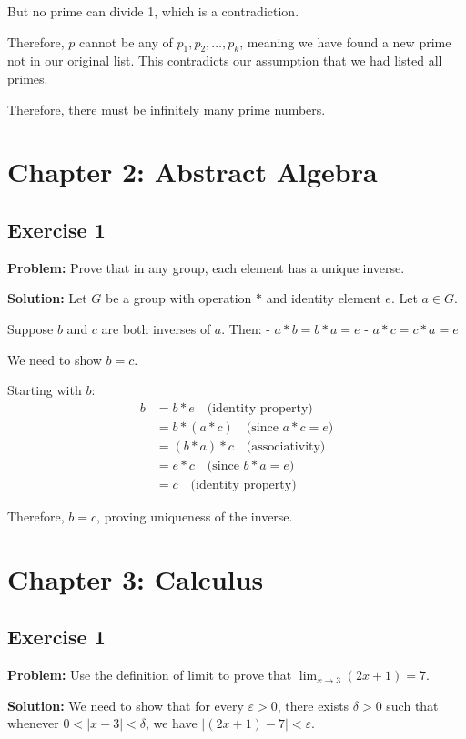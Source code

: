 But no prime can divide 1, which is a contradiction.

Therefore, $p$ cannot be any of $p_1, p_2, \ldots, p_k$, meaning we have found a new prime not in our original list. This contradicts our assumption that we had listed all primes.

Therefore, there must be infinitely many prime numbers.

\section{Chapter 2: Abstract Algebra}

\subsection{Exercise 1}
\textbf{Problem:} Prove that in any group, each element has a unique inverse.

\textbf{Solution:}
Let $G$ be a group with operation $*$ and identity element $e$. Let $a \in G$.

Suppose $b$ and $c$ are both inverses of $a$. Then:
- $a * b = b * a = e$
- $a * c = c * a = e$

We need to show $b = c$.

Starting with $b$:
\begin{align}
b &= b * e \quad \text{(identity property)} \\
&= b * (a * c) \quad \text{(since $a * c = e$)} \\
&= (b * a) * c \quad \text{(associativity)} \\
&= e * c \quad \text{(since $b * a = e$)} \\
&= c \quad \text{(identity property)}
\end{align}

Therefore, $b = c$, proving uniqueness of the inverse.

\section{Chapter 3: Calculus}

\subsection{Exercise 1}
\textbf{Problem:} Use the definition of limit to prove that $\lim_{x \to 3} (2x + 1) = 7$.

\textbf{Solution:}
We need to show that for every $\varepsilon > 0$, there exists $\delta > 0$ such that whenever $0 < |x - 3| < \delta$, we have $|(2x + 1) - 7| < \varepsilon$.


